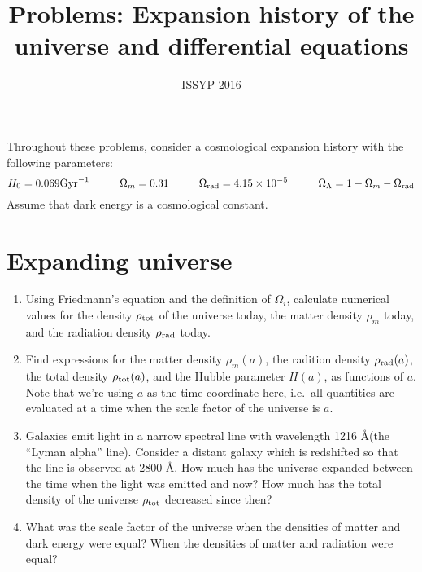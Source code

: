 \documentclass[aps,prd,superscriptaddress,groupedaddress,nofootinbib,nobibnotes]{revtex4}
\newcommand{\be}{\begin{equation}}
\newcommand{\ee}{\end{equation}}
\begin{document}
\title{Problems: Expansion history of the universe and differential equations}

\author{ISSYP 2016}


\maketitle

\par\noindent
Throughout these problems, consider a cosmological expansion history with the following parameters:
\be
H_0 = 0.069 \mbox{Gyr}^{-1}
  \hspace{1cm}
\Omega_m = 0.31
  \hspace{1cm}
\Omega_{\rm rad} = 4.15 \times 10^{-5}
  \hspace{1cm}
\Omega_\Lambda = 1 - \Omega_m - \Omega_{\rm rad}
\ee
Assume that dark energy is a cosmological constant.

\section{Expanding universe}

\begin{enumerate}
\item Using Friedmann's equation and the definition of $\Omega_i$, calculate numerical
  values for the density $\rho_{\rm tot}$ of the universe today, the matter density $\rho_m$
  today, and the radiation density $\rho_{\rm rad}$ today.
\item Find expressions for the matter density $\rho_m(a)$, the radition density $\rho_{\rm rad}(a)$,
  the total density $\rho_{\rm tot}(a)$, and the Hubble parameter $H(a)$, as functions of $a$.  
  Note that we're using $a$ as the time coordinate here, i.e.~all quantities are evaluated at 
  a time when the scale factor of the universe is $a$.
\item Galaxies emit light in a narrow spectral line with wavelength 1216 \AA (the ``Lyman alpha'' line).
  Consider a distant galaxy which is redshifted so that the line is observed at 2800 \AA.
  How much has the universe expanded between the time when the light was emitted and now?
  How much has the total density of the universe $\rho_{\rm tot}$ decreased since then?
\item What was the scale factor of the universe when the densities of matter and dark energy were equal?
  When the densities of matter and radiation were equal?
\end{enumerate}
  
\end{document}
